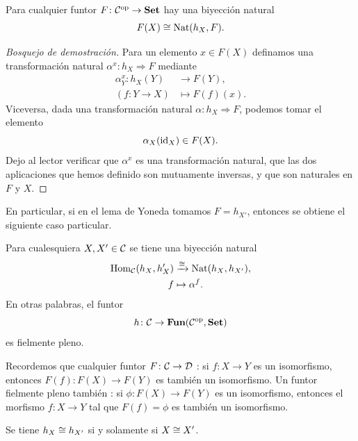 \documentclass{article}
\numberwithin{equation}{section}
\theoremstyle{definition}
\begin{document}
\begin{teorema}
  Para cualquier funtor $F\colon \mathcal{C}^\mathrm{op} \to \text{\bf Set}$ hay una
  biyección natural
  $$F (X) \cong \operatorname{Nat} (h_X, F).$$

  \begin{proof}[Bosquejo de demostración]
    Para un elemento $x \in F (X)$ definamos una transformación natural
    $\alpha^x\colon h_X \Rightarrow F$ mediante
    \begin{align*}
      \alpha_Y^x\colon h_X (Y) & \to F (Y),\\
      (f\colon Y\to X) & \mapsto F (f) (x).
    \end{align*}
    Viceversa, dada una transformación natural $\alpha\colon h_X \Rightarrow F$,
    podemos tomar el elemento
    $$\alpha_X (\mathrm{id}_{X}) \in F (X).$$
    Dejo al lector verificar que $\alpha^x$ es una transformación natural,
    que las dos aplicaciones que hemos definido son mutuamente inversas,
    y que son naturales en $F$ y $X$.
  \end{proof}
\end{teorema}

En particular, si en el lema de Yoneda tomamos $F = h_{X'}$, entonces se obtiene
el siguiente caso particular.

\begin{corolario}
  Para cualesquiera $X,X' \in \mathcal{C}$ se tiene una biyección natural
  \begin{align*}
    \operatorname{Hom}_\mathcal{C} (h_X, h_X') & \xrightarrow{\cong} \operatorname{Nat} (h_X, h_{X'}),\\
    f & \mapsto \alpha^f.
  \end{align*}
  En otras palabras, el funtor
  $$h\colon \mathcal{C} \to \text{\bf Fun} (\mathcal{C}^\mathrm{op}, \text{\bf Set})$$
  es fielmente pleno.
\end{corolario}

Recordemos que cualquier funtor $F\colon \mathcal{C} \to \mathcal{D}$
: si $f\colon X\to Y$ es un isomorfismo, entonces
$F (f)\colon F (X) \to F (Y)$ es también un isomorfismo. Un funtor fielmente
pleno también : si $\phi\colon F (X) \to F (Y)$
es un isomorfismo, entonces el morfismo $f\colon X\to Y$ tal que $F (f) = \phi$
es también un isomorfismo.

\begin{corolario}
  Se tiene $h_X \cong h_{X'}$ si y solamente si $X \cong X'$.
\end{corolario}
\end{document}
